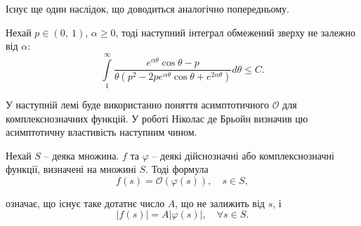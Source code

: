 Існує ще один наслідок, що доводиться аналогічно попередньому. 
\begin{corollary}
	\label{lem:trig_exp_bound}
	Нехай $p \in (0,~1)$, $\alpha \geq 0$, тоді наступний інтеграл обмежений зверху не залежно від $\alpha$:
	\begin{equation*}
	\int\limits_{1}^{\infty} \frac{e^{\alpha\theta}\cos \theta - p}{\theta(p^2 - 2pe^{\alpha\theta}\cos\theta + e^{2\alpha\theta})} d \theta \leq C.
	\end{equation*}
\end{corollary}

У наступній лемі буде використанно поняття асимптотичного $\mathcal{O}$ для комплекснозначних функцій. У роботі \cite{de1970asymptotic} Ніколас де Брьойн визначив цю асимптотичну властивість наступним чином.
\begin{defin}
Нехай $S$ -- деяка множина. $f$ та $\varphi$ -- деякі дійснозначні або комплекснозначні функції, визначені на множині $S$. Тоді формула
\begin{equation*}
f(s) = \mathcal{O}(\varphi(s)), \quad s \in S,
\end{equation*}

означає, що існує таке дотатнє число $A$, що не залижить від $s$, і
\begin{equation*}
|f(s)| = A |\varphi(s)|, \quad \forall s \in S.
\end{equation*}
\end{defin}

